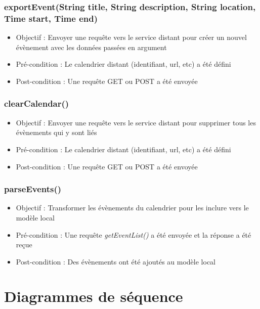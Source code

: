 			\subsubsection{exportEvent(String title, String description, String location, Time start, Time end)}
				\begin{itemize}
					\item Objectif  : Envoyer une requête vers le service distant pour créer un nouvel évènement avec les données passées en argument
					\item Pré-condition : Le calendrier distant (identifiant, url, etc) a été défini
					\item Post-condition : Une requête GET ou POST a été envoyée
				\end{itemize}
				
			\subsubsection{clearCalendar()}
				\begin{itemize}
					\item Objectif  : Envoyer une requête vers le service distant pour supprimer tous les évènements qui y sont liés
					\item Pré-condition : Le calendrier distant (identifiant, url, etc) a été défini
					\item Post-condition : Une requête GET ou POST a été envoyée
				\end{itemize}
				
			\subsubsection{parseEvents()}
				\begin{itemize}
					\item Objectif  : Transformer les évènements du calendrier pour les inclure vers le modèle local
					\item Pré-condition : Une requête \emph{getEventList()} a été envoyée et la réponse a été reçue
					\item Post-condition : Des évènements ont été ajoutés au modèle local
				\end{itemize}
				
	\section{Diagrammes de séquence}
